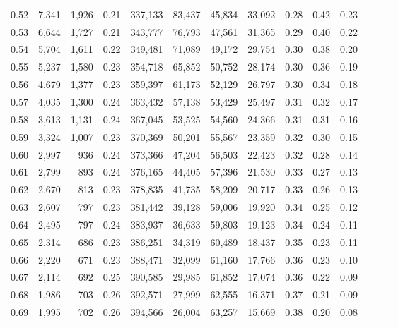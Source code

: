 \begin{tabular}{rrrrrrrrrrrrrr}
0.52 &   7,341 &  1,926 &  0.21 &  337,133 &   83,437 &  45,834 &  33,092 &  0.28 &  0.42 &      0.23 \\
0.53 &   6,644 &  1,727 &  0.21 &  343,777 &   76,793 &  47,561 &  31,365 &  0.29 &  0.40 &      0.22 \\
0.54 &   5,704 &  1,611 &  0.22 &  349,481 &   71,089 &  49,172 &  29,754 &  0.30 &  0.38 &      0.20 \\
0.55 &   5,237 &  1,580 &  0.23 &  354,718 &   65,852 &  50,752 &  28,174 &  0.30 &  0.36 &      0.19 \\
0.56 &   4,679 &  1,377 &  0.23 &  359,397 &   61,173 &  52,129 &  26,797 &  0.30 &  0.34 &      0.18 \\
0.57 &   4,035 &  1,300 &  0.24 &  363,432 &   57,138 &  53,429 &  25,497 &  0.31 &  0.32 &      0.17 \\
0.58 &   3,613 &  1,131 &  0.24 &  367,045 &   53,525 &  54,560 &  24,366 &  0.31 &  0.31 &      0.16 \\
0.59 &   3,324 &  1,007 &  0.23 &  370,369 &   50,201 &  55,567 &  23,359 &  0.32 &  0.30 &      0.15 \\
0.60 &   2,997 &    936 &  0.24 &  373,366 &   47,204 &  56,503 &  22,423 &  0.32 &  0.28 &      0.14 \\
0.61 &   2,799 &    893 &  0.24 &  376,165 &   44,405 &  57,396 &  21,530 &  0.33 &  0.27 &      0.13 \\
0.62 &   2,670 &    813 &  0.23 &  378,835 &   41,735 &  58,209 &  20,717 &  0.33 &  0.26 &      0.13 \\
0.63 &   2,607 &    797 &  0.23 &  381,442 &   39,128 &  59,006 &  19,920 &  0.34 &  0.25 &      0.12 \\
0.64 &   2,495 &    797 &  0.24 &  383,937 &   36,633 &  59,803 &  19,123 &  0.34 &  0.24 &      0.11 \\
0.65 &   2,314 &    686 &  0.23 &  386,251 &   34,319 &  60,489 &  18,437 &  0.35 &  0.23 &      0.11 \\
0.66 &   2,220 &    671 &  0.23 &  388,471 &   32,099 &  61,160 &  17,766 &  0.36 &  0.23 &      0.10 \\
0.67 &   2,114 &    692 &  0.25 &  390,585 &   29,985 &  61,852 &  17,074 &  0.36 &  0.22 &      0.09 \\
0.68 &   1,986 &    703 &  0.26 &  392,571 &   27,999 &  62,555 &  16,371 &  0.37 &  0.21 &      0.09 \\
0.69 &   1,995 &    702 &  0.26 &  394,566 &   26,004 &  63,257 &  15,669 &  0.38 &  0.20 &      0.08 \\

\end{tabular}
